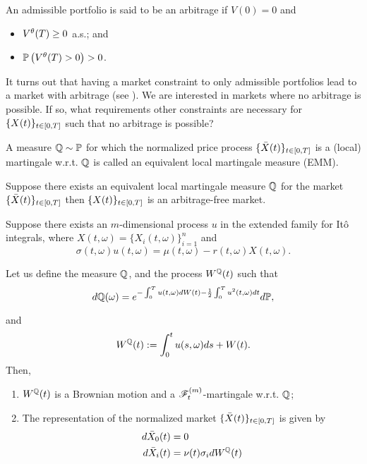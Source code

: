\documentclass[../TGMAFFIRO.tex]{subfiles}
\begin{document}
\begin{definition}
	An admissible portfolio is said to be an arbitrage if $V(0) = 0$ and
	\begin{itemize}
		\item $V^\theta(T) \geq 0$ a.s.; and
		\item $\mathbb{P}\left(V^\theta(T) > 0 \right) > 0$.
	\end{itemize}
\end{definition}

It turns out that having a market constraint to only admissible portfolios lead to a market with arbitrage (see ). We are interested in markets where no arbitrage is possible. If so, what requirements other constraints are necessary for $\{X(t)\}_{t\in[0,T]}$ such that no arbitrage is possible?

\begin{definition}
	A measure $\mathbb{Q} \sim \mathbb{P}$ for which the normalized price process $\{\bar{X}(t)\}_{t\in[0,T]}$ is a (local) martingale w.r.t. $\mathbb{Q}$ is called an equivalent local martingale measure (EMM).
\end{definition}

\begin{proposition}
	Suppose there exists an equivalent local martingale measure $\mathbb{Q}$ for the market $\{\bar{X}(t)\}_{t\in[0,T]}$ then $\{X(t)\}_{t\in[0,T]}$ is an arbitrage-free market.
\end{proposition}

\begin{proposition}\label{prop:qmartingale-market}
	Suppose there exists an $m$-dimensional process $u$ in the extended family for It\^o integrals, where $X(t, \omega) = \{X_i(t,\omega)\}_{i=1}^n$ and
	\begin{equation}
		\sigma(t,\omega)u(t,\omega) = \mu(t, \omega) - r(t, \omega)X(t,\omega).
	\end{equation}

Let us define the measure $\mathbb{Q}$, and the process $W^{\mathbb{Q}}(t)$ such that
\[
	d\mathbb{Q}(\omega) = e^{-\int_0^Tu(t,\omega) dW(t) - \frac{1}{2}\int_0^Tu^2(t,\omega) dt}d\mathbb{P},
\]

and
\[
	W^{\mathbb{Q}}(t) := \int_0^tu(s,\omega) ds + W(t).
\]
Then,
\begin{enumerate}
	\item $W^{\mathbb{Q}}(t)$ is a Brownian motion and a $\mathscr{F}_t^{(m)}$-martingale w.r.t. $\mathbb{Q}$;
	\item The representation of the normalized market $\{\bar{X}(t)\}_{t\in[0,T]}$ is given by
	\begin{align*}
		d\bar{X}_0(t) &= 0 \\
		d\bar{X}_i(t) &= \nu(t)\sigma_i dW^{\mathbb{Q}}(t)
	\end{align*}
\end{enumerate}
\end{proposition}
\end{document}
